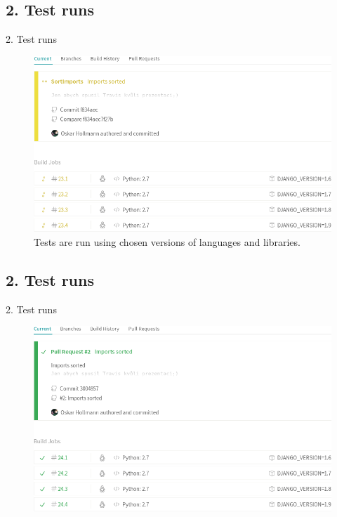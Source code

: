\documentclass[xcolor=x11names,compress,t]{beamer}
\renewcommand{\(}{\begin{columns}[T]}
\renewcommand{\)}{\end{columns}}
\newcommand{\<}[1]{\begin{column}{#1}}
\renewcommand{\>}{\end{column}}
\newenvironment{slide}[1]{\subsection{#1} \begin{frame}{#1}}{\end{frame}}
\begin{document}
\begin{slide}{2. Test runs}
\begin{figure}[htb]
    \centering
    \includegraphics[width=\textwidth]{detection-travis}
    \caption{Tests are run using chosen versions of languages and libraries.}
\end{figure}
\end{slide}

\begin{slide}{2. Test runs}
\begin{figure}[htb]
    \centering
    \includegraphics[width=\textwidth]{success-travis}
\end{figure}
\end{slide}
\end{document}
